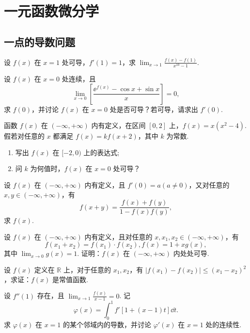 \section{一元函数微分学}
	\subsection{一点的导数问题}

	\begin{ti}
		设 $f(x)$ 在 $x = 1$ 处可导，$f'(1) = 1$，求 $\lim_{x \to 1} \frac{f(x) - f(1)}{x^{10} - 1}$.
	\end{ti}

	\begin{ti}
		设 $f(x)$ 在 $x = 0$ 处连续，且 \[\lim_{x \to 0} \left[ \frac{\ee^{f(x)} - \cos x + \sin x}{x} \right] = 0,\]求 $f(0)$，并讨论 $f(x)$ 在 $x = 0$ 处是否可导？若可导，请求出 $f'(0)$.
	\end{ti}

	\begin{ti}
		函数 $f(x)$ 在 $(-\infty,+\infty)$ 内有定义，在区间 $[0,2]$ 上，$f(x) = x\left( x^{2} - 4 \right)$. 假若对任意的 $x$ 都满足 $f(x) = k f(x + 2)$，其中 $k$ 为常数.
		\begin{enumerate}
			\item 写出 $f(x)$ 在 $[-2,0)$ 上的表达式;
			\item 问 $k$ 为何值时，$f(x)$ 在 $x = 0$ 处可导？
		\end{enumerate}
	\end{ti}

	\begin{ti}
		设 $f(x)$ 在 $(-\infty,+\infty)$ 内有定义，且 $f'(0) = a(a \ne 0)$，又对任意的 $x,y \in (-\infty,+\infty)$，有
		\[
			f(x + y) = \frac{f(x) + f(y)}{1 - f(x)f(y)},
		\]
		求 $f(x)$.
	\end{ti}
	
	\begin{ti}
		设 $f(x)$ 在 $(-\infty,+\infty)$ 内有定义，且对任意的 $x,x_{1},x_{2} \in (-\infty,+\infty)$，有
		\[
			f(x_{1} + x_{2}) = f(x_{1}) \cdot f(x_{2}),f(x) = 1 + xg(x),
		\]
		其中 $\lim_{x \to 0} g(x) = 1$. 证明：$f(x)$ 在 $(-\infty,+\infty)$ 内处处可导.
	\end{ti}

	\begin{ti}
		设 $f(x)$ 定义在 $\mathbb{R}$ 上，对于任意的 $x_{1},x_{2}$，有 $|f(x_{1}) - f(x_{2})| \leq (x_{1} - x_{2})^{2}$，求证：$f(x)$ 是常值函数.
	\end{ti}

	\begin{ti}
		设 $f''(1)$ 存在，且 $\lim_{x \to 1}\frac{f(x)}{x - 1} = 0$. 记
		\[
			\varphi(x) = \int_{0}^{1} f'[1 + (x - 1)t]\dd{t}.
		\]
		求 $\varphi(x)$ 在 $x = 1$ 的某个邻域内的导数，并讨论 $\varphi'(x)$ 在 $x = 1$ 处的连续性.
	\end{ti}

